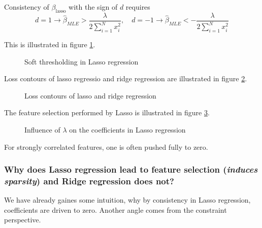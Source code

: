Consistency of $\beta_{\text{lasso}}$ with the sign of $d$ requires
\begin{equation}
    d=1 \rightarrow \hat{\beta}_{M L E}>\frac{\lambda}{2 \sum_{i=1}^N x_i^2}, \quad d=-1 \rightarrow \hat{\beta}_{M L E}<-\frac{\lambda}{2 \sum_{i=1}^N x_i^2}
\end{equation}



This is illustrated in figure \ref{fig:lasso_reg}.

\begin{figure}[!htb]
    \centering
    
    \caption{Soft thresholding in Lasso regression}
    \label{fig:lasso_reg}
\end{figure}

Loss contours of lasso regressio and ridge regression are illustrated in figure \ref{fig:ridge_lasso_contours}.

\begin{figure}[!htb]
    \centering
    
    \caption{Loss contours of lasso and ridge regression}
    \label{fig:ridge_lasso_contours}
\end{figure}

The feature selection performed by Lasso is illustrated in figure \ref{fig:lasso_lambda}.

\begin{figure}[!htb]
    \centering
    
    \caption{Influence of $\lambda$ on the coefficients in Lasso regression}
    \label{fig:lasso_lambda}
\end{figure}

For strongly correlated features, one is often pushed fully to zero.

\subsubsection{Why does Lasso regression lead to feature selection (\textit{induces sparsity}) and Ridge regression does not?}
We have already gaines some intuition, why by consistency in Lasso regression, coefficients are driven to zero.
Another angle comes from the constraint perspective.

